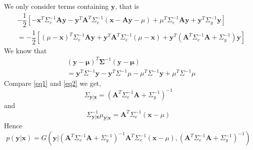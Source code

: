 \documentclass{article}
\begin{document}
We only consider terms containing $\mathbf{y}$, that is
\begin{equation}
  \label{eq1}
  \begin{split}
    &-\dfrac{1}{2}[-\mathbf{x}^T\Sigma_e^{-1}\mathbf{Ay}-\mathbf{y}^T\mathbf{A}^T\Sigma_e^{-1}(\mathbf{x}-\mathbf{Ay}-\mu)+\mu^T\Sigma_e^{-1}\mathbf{Ay}+\mathbf{y}^T\Sigma_y^{-1}\mathbf{y}]\\
    &=-\dfrac{1}{2}[(\mu-\mathbf{x})^T\Sigma_e^{-1}\mathbf{Ay}+\mathbf{y}^T\mathbf{A}^T\Sigma_e^{-1}(\mu-\mathbf{x})+\mathbf{y}^T(\mathbf{A}^T\Sigma_e^{-1}\mathbf{A}+\Sigma_y^{-1})\mathbf{y}]
  \end{split}
\end{equation}
We know that
\begin{equation}
  \label{eq2}
  \begin{split}
    &(\mathbf{y}-\mathbf{\mu})^T\mathbf{\Sigma}^{-1}(\mathbf{y}-\mathbf{\mu})\\
    &=\mathbf{y}^T\Sigma^{-1}\mathbf{y}-\mathbf{y}^T\Sigma^{-1}\mu-\mu^T\Sigma^{-1}\mathbf{y}+\mu^T\Sigma^{-1}\mu
  \end{split}
\end{equation}
Compare \ref{eq1} and \ref{eq2} we get,
\begin{equation}
  \Sigma_{\mathbf{y|x}}=(\mathbf{A}^T\Sigma_e^{-1}\mathbf{A}+\Sigma_y^{-1})^{-1}  
\end{equation}
and 
\begin{equation}
  \Sigma_{\mathbf{y|x}}^{-1}\mu_{\mathbf{y}|\mathbf{x}}=\mathbf{A}^T\Sigma_e^{-1}(\mathbf{x}-\mu)  
\end{equation}
Hence
\begin{equation}
  p(\mathbf{y}|\mathbf{x})=G(\mathbf{y}|(\mathbf{A}^T\Sigma_e^{-1}\mathbf{A}+\Sigma_y^{-1})^{-1}\mathbf{A}^T\Sigma_e^{-1}(\mathbf{x}-\mu), (\mathbf{A}^T\Sigma_e^{-1}\mathbf{A}+\Sigma_y^{-1})^{-1})  
\end{equation}
\end{document}
